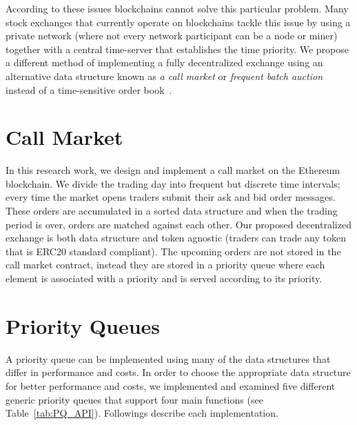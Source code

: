 According to these issues blockchains cannot solve this particular problem. Many stock exchanges that currently operate on blockchains tackle this issue by using a private network (where not every network participant can be a node or miner) together with a central time-server that establishes the time priority. We propose a different method of implementing a fully decentralized exchange using an alternative data structure known as \textit{a call market} or \textit{frequent batch auction} instead of a time-sensitive order book~\cite{clark2014decentralizing}.



\section{Call Market}\label{sec:callmarket}

In this research work, we design and implement a call market on the Ethereum blockchain. We divide the trading day into frequent but discrete time intervals; every time the market opens traders submit their ask and bid order messages. These orders are accumulated in a sorted data structure and when the trading period is over, orders are matched against each other. Our proposed decentralized exchange is both data structure and token agnostic (traders can trade any token that is ERC20 standard compliant). The upcoming orders are not stored in the call market contract, instead they are stored in a priority queue where each element is associated with a priority and is served according to its priority.


\section{Priority Queues}

 A priority queue can be implemented using many of the data structures that differ in performance and costs. In order to choose the appropriate data structure for better performance and costs, we implemented and examined five different generic priority queues that support four main functions (see Table~\ref{tab:PQ_API}). Followings describe each implementation. 


